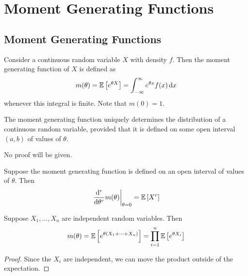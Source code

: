 \documentclass{article}
\begin{document}
\section{Moment Generating Functions}
\subsection{Moment Generating Functions}
Consider a continuous random variable $X$ with density $f$. Then the moment generating function of $X$ is defined as
\[ m(\theta) = \mathbb{E}\left[{e^{\theta X}}\right] = \int_{-\infty}^\infty e^{\theta x} f(x) \dd{x} \]
whenever this integral is finite. Note that $m(0) = 1$.
\begin{theorem}
	The moment generating function uniquely determines the distribution of a continuous random variable, provided that it is defined on some open interval $(a, b)$ of values of $\theta$.
\end{theorem}
\noindent No proof will be given.
\begin{theorem}
	Suppose the moment generating function is defined on an open interval of values of $\theta$. Then
	\[ \eval{\dv[r]{\theta}m(\theta)}_{\theta = 0} = \expect{X^r} \]
\end{theorem}
\begin{theorem}
	Suppose $X_1, \dots, X_n$ are independent random variables. Then
	\[ m(\theta) = \mathbb{E}\left[{e^{\theta(X_1 + \dots + X_n)}}\right] = \prod_{i=1}^n \mathbb{E}\left[{e^{\theta X_i}}\right] \]
\end{theorem}
\begin{proof}
	Since the $X_i$ are independent, we can move the product outside of the expectation.
\end{proof}
\end{document}
